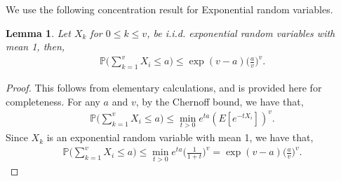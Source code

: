 \documentclass[10pt, conference, letterpaper]{IEEEtran}
\newtheorem{lemma}{Lemma}
\begin{document}
We use the following concentration result for Exponential random variables.
\begin{lemma}
	\label{lemma:sum_of_exponentials}
	Let $X_k$ for $0\leq k \leq v$, be i.i.d. exponential random variables with mean 1, then,
	\begin{eqnarray}
	\label{eq:exp}
	\mathbb{P}\bigg(\sum_{k=1}^{v} X_i \leq a\bigg) \leq  \exp(v-a)\bigg(\frac{a}{v}\bigg)^v.
	\end{eqnarray}
\end{lemma}
\begin{proof}
	This follows from elementary calculations, and is provided here for completeness. For any $a$ and $v$, by the Chernoff bound, we have that,
	\begin{eqnarray*}
		\mathbb{P}\bigg(\sum_{k=1}^{v} X_i \leq a\bigg) \leq \min_{t > 0} e^{ta} (E[e^{-tX_i}])^v.
	\end{eqnarray*}
	Since $X_k$ is an exponential random variable with mean 1, we have that,
	\begin{eqnarray*}
		\mathbb{P}\bigg(\sum_{k=1}^{v} X_i \leq a\bigg) \leq \min_{t > 0} e^{ta} \bigg(\frac{1}{1+t} \bigg)^v = \exp(v-a)\bigg(\frac{a}{v}\bigg)^v.
	\end{eqnarray*}
\end{proof}
\end{document}
